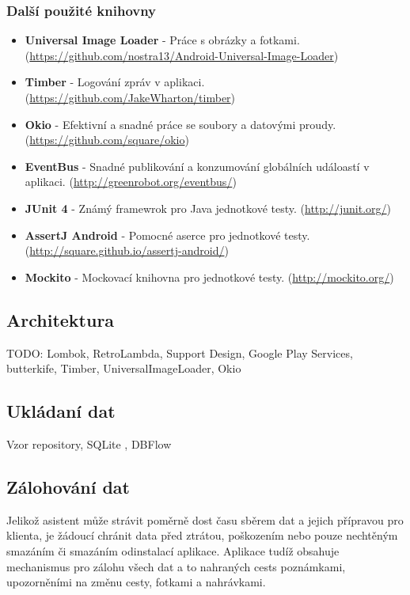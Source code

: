 \documentclass{article}
\begin{document}
\subsubsection{Další použité knihovny}
\begin{itemize}
  \item \textbf{Universal Image Loader} - Práce s obrázky a fotkami. (\url{https://github.com/nostra13/Android-Universal-Image-Loader})
  \item \textbf{Timber} - Logování zpráv v aplikaci. (\url{https://github.com/JakeWharton/timber})
  \item \textbf{Okio} - Efektivní a snadné práce se soubory a datovými proudy. (\url{https://github.com/square/okio})
  \item \textbf{EventBus} - Snadné publikování a konzumování globálních událoastí v aplikaci. (\url{http://greenrobot.org/eventbus/})
  \item \textbf{JUnit 4} - Známý framewrok pro Java jednotkové testy. (\url{http://junit.org/})
  \item \textbf{AssertJ Android} - Pomocné aserce pro jednotkové testy. (\url{http://square.github.io/assertj-android/})
  \item \textbf{Mockito} - Mockovací knihovna pro jednotkové testy. (\url{http://mockito.org/})



\end{itemize}

\subsection{Architektura}


TODO: Lombok, RetroLambda, Support Design, Google Play Services, butterkife, Timber, UniversalImageLoader, Okio

\subsection{Ukládaní dat}
Vzor repository, SQLite , DBFlow

\subsection{Zálohování dat}
Jelikož asistent může strávit poměrně dost času sběrem dat a jejich přípravou pro klienta, je žádoucí chránit data před ztrátou,
poškozením nebo pouze nechtěným smazáním či smazáním odinstalací aplikace. Aplikace tudíž obsahuje mechanismus pro zálohu všech
dat a to nahraných cests poznámkami, upozorněními na změnu cesty, fotkami a nahrávkami.
\end{document}
